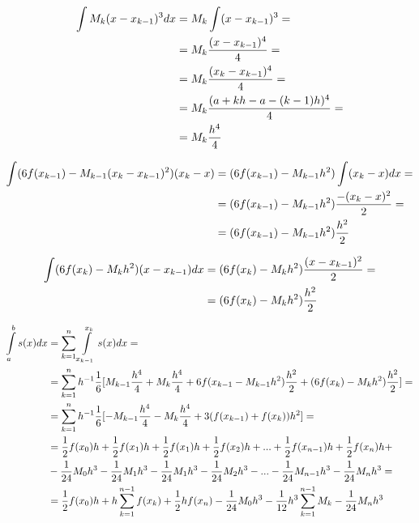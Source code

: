 \documentclass{article}[16pt]
\begin{document}
\begin{align*}
    \int M_{k}(x-x_{k-1})^3dx&=M_k\int(x-x_{k-1})^3=\\
    &=M_k{(x-x_{k-1})^4\over4}=\\
    &=M_k{(x_k-x_{k-1})^4\over4}=\\
    &=M_k{(a+kh-a-(k-1)h)^4\over4}=\\
    &=M_k{h^4\over4}
\end{align*}

\begin{align*}
    \int(6f(x_{k-1})-M_{k-1}(x_k-x_{k-1})^2)(x_k-x)&=(6f(x_{k-1})-M_{k-1}h^2)\int(x_k-x)dx=\\
    &=(6f(x_{k-1})-M_{k-1}h^2){-(x_k-x)^2\over2}=\\
    &=(6f(x_{k-1})-M_{k-1}h^2){h^2\over2}
\end{align*}

\begin{align*}
    \int(6f(x_k)-M_kh^2)(x-x_{k-1})dx&=(6f(x_k)-M_kh^2){(x-x_{k-1})^2\over2}=\\
    &=(6f(x_k)-M_kh^2){h^2\over2}
\end{align*}

\begin{align*}
    \int\limits_a^bs(x)dx&=\sum\limits_{k=1}^n\int\limits_{x_{k-1}}^{x_k}s(x)dx=\\
    &=\sum\limits_{k=1}^nh^{-1}\frac16[M_{k-1}{h^4\over4}+M_k{h^4\over4}+6f(x_{k-1}-M_{k-1}h^2){h^2\over2}+(6f(x_k)-M_kh^2){h^2\over2}]=\\
    &=\sum\limits_{k=1}^nh^{-1}\frac16[-M_{k-1}{h^4\over4}-M_k{h^4\over4}+3(f(x_{k-1})+f(x_k))h^2]=\\
    &=\frac12f(x_0)h+\frac12f(x_1)h+\frac12f(x_1)h+\frac12f(x_2)h+...+\frac12f(x_{n-1})h+\frac12f(x_n)h+\\
    &-\frac1{24}M_0h^3-\frac1{24}M_1h^3-\frac1{24}M_1h^3-\frac1{24}M_2h^3-...-\frac1{24}M_{n-1}h^3-\frac1{24}M_nh^3=\\
    &=\frac12f(x_0)h+h\sum\limits_{k=1}^{n-1}f(x_k)+\frac12hf(x_n)-\frac1{24}M_0h^3-\frac1{12}h^3\sum\limits_{k=1}^{n-1}M_{k}-\frac1{24}M_nh^3
\end{align*}
\end{document}
